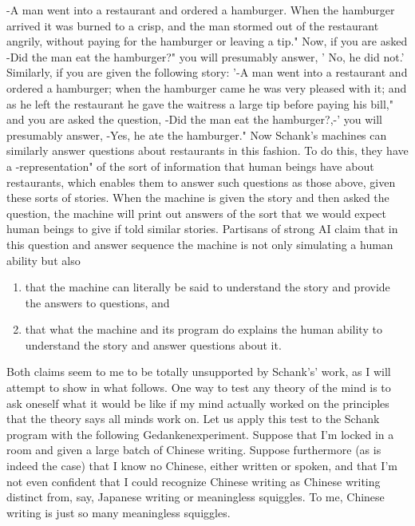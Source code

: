 -A man went into a restaurant and ordered a hamburger. When the hamburger arrived it was burned to a crisp,
and the man stormed out of the restaurant angrily, without paying for the hamburger or leaving a tip." Now, if
you are asked -Did the man eat the hamburger?" you will presumably answer, ' No, he did not.' Similarly, if
you are given the following story: '-A man went into a restaurant and ordered a hamburger; when the
hamburger came he was very pleased with it; and as he left the restaurant he gave the waitress a large tip
before paying his bill," and you are asked the question, -Did the man eat the hamburger?,-' you will presumably
answer, -Yes, he ate the hamburger." Now Schank's machines can similarly answer questions about restaurants
in this fashion. To do this, they have a -representation" of the sort of information that human beings have about
restaurants, which enables them to answer such questions as those above, given these sorts of stories. When the
machine is given the story and then asked the question, the machine will print out answers of the sort that we
would expect human beings to give if told similar stories. Partisans of strong AI claim that in this question and
answer sequence the machine is not only simulating a human ability but also
\begin{enumerate}
\item that the machine can literally be said to understand the story and provide the answers to questions, and
\item that what the machine and its program do explains the human ability to understand the story and answer
questions about it.
\end{enumerate}
Both claims seem to me to be totally unsupported by Schank's' work, as I will attempt to show in what follows.
One way to test any theory of the mind is to ask oneself what it would be like if my mind actually worked on
the principles that the theory says all minds work on. Let us apply this test to the Schank program with the
following Gedankenexperiment. Suppose that I'm locked in a room and given a large batch of Chinese writing.
Suppose furthermore (as is indeed the case) that I know no Chinese, either written or spoken, and that I'm not
even confident that I could recognize Chinese writing as Chinese writing distinct from, say, Japanese writing or
meaningless squiggles. To me, Chinese writing is just so many meaningless squiggles.

